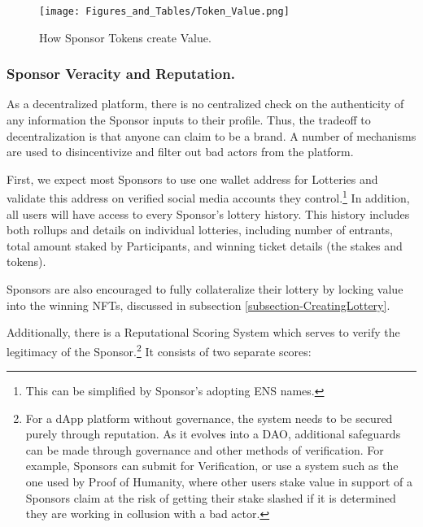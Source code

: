 \documentclass[runningheads]{llncs}
\begin{document}
\begin{figure}[H]
\centering
\texttt{[image: Figures\_and\_Tables/Token\_Value.png]}
\caption{How Sponsor Tokens create Value.}
\end{figure}

\subsubsection{Sponsor Veracity and Reputation.}  As a decentralized platform, there is no centralized check on the authenticity of any information the Sponsor inputs to their profile.  Thus, the tradeoff to decentralization is that anyone can claim to be a brand.  A number of mechanisms are used to disincentivize and filter out bad actors from the platform.

First, we expect most Sponsors to use one wallet address for Lotteries and validate this address on verified social media accounts they control.\footnote{This can be simplified by Sponsor’s adopting ENS names.}   In addition, all users will have access to every Sponsor’s lottery history.  This history includes both rollups and details on individual lotteries, including number of entrants, total amount staked by Participants, and winning ticket details (the stakes and tokens). 

Sponsors are also encouraged to fully collateralize their lottery by locking value into the winning NFTs, discussed in subsection \ref{subsection-CreatingLottery}.

Additionally, there is a Reputational Scoring System which serves to verify the legitimacy of the Sponsor.\footnote{For a dApp platform without governance, the system needs to be secured purely through reputation.  As it evolves into a DAO, additional safeguards can be made through governance and other methods of verification.  For example, Sponsors can submit for Verification, or use a system such as the one used by Proof of Humanity, where other users stake value in support of a Sponsors claim at the risk of getting their stake slashed if it is determined they are working in collusion with a bad actor.}   It consists of two separate scores:
\end{document}
